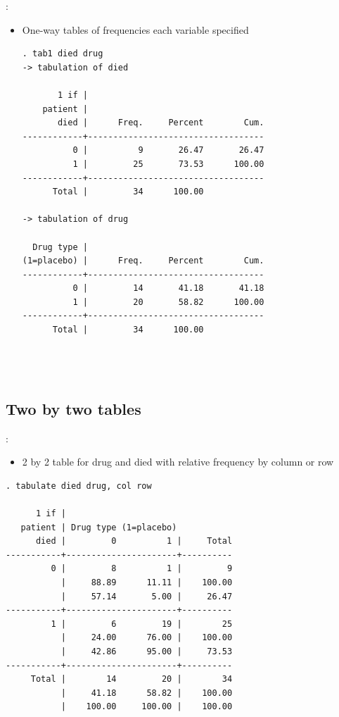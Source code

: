 \begin{frame}[fragile]{\secname: \subsecname}
\begin{itemize}	
\item One-way tables of frequencies each variable specified
\scriptsize
\begin{verbatim}
. tab1 died drug
-> tabulation of died  

       1 if |
    patient |
       died |      Freq.     Percent        Cum.
------------+-----------------------------------
          0 |          9       26.47       26.47
          1 |         25       73.53      100.00
------------+-----------------------------------
      Total |         34      100.00

-> tabulation of drug  

  Drug type |
(1=placebo) |      Freq.     Percent        Cum.
------------+-----------------------------------
          0 |         14       41.18       41.18
          1 |         20       58.82      100.00
------------+-----------------------------------
      Total |         34      100.00


	
\end{verbatim}
\end{itemize}
\end{frame}

\subsection{Two by two tables}
\begin{frame}[fragile]{\secname: \subsecname}
\begin{itemize}
\item 2 by 2 table for drug and died with relative frequency by column or row
\end{itemize}
\scriptsize
\begin{verbatim}
. tabulate died drug, col row

      1 if |
   patient | Drug type (1=placebo)
      died |         0          1 |     Total
-----------+----------------------+----------
         0 |         8          1 |         9 
           |     88.89      11.11 |    100.00 
           |     57.14       5.00 |     26.47 
-----------+----------------------+----------
         1 |         6         19 |        25 
           |     24.00      76.00 |    100.00 
           |     42.86      95.00 |     73.53 
-----------+----------------------+----------
     Total |        14         20 |        34 
           |     41.18      58.82 |    100.00 
           |    100.00     100.00 |    100.00 
	
\end{verbatim}
\end{frame}	

